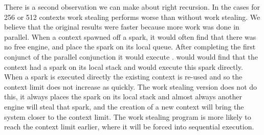 There is a second observation we can make about right recursion.
In the cases for 256 or 512 contexts work stealing performs worse than
without work stealing.
We believe that the original results were faster because more work was done
in parallel.
When a context spawned off a spark,
it would often find that there was no free engine,
and place the spark on its local queue.
After completing the first conjunct of the parallel conjunction it would
execute \joinandcontinue.
\joinandcontinue would would find that the context had a spark on its local
stack and would execute this spark directly.
When a spark is executed directly the existing context is re-used and so the
context limit does not increase as quickly.
The work stealing version does not do this,
it always places the spark on its local stack and almost always
another engine will steal that spark,
and the creation of a new context will bring the system closer to the
context limit.
The work stealing program is more likely to reach the context limit earlier,
where it will be forced into sequential execution.


